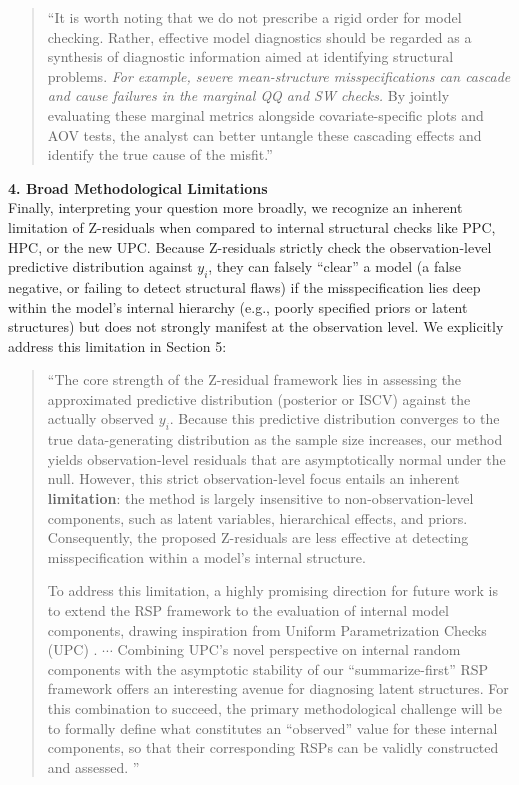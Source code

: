 \documentclass[11pt]{article}
\begin{document}
\begin{quote}
``It is worth noting that we do not prescribe a rigid order for model checking. Rather, effective model diagnostics should be regarded as a synthesis of diagnostic information aimed at identifying structural problems. \textit{For example, severe mean-structure misspecifications can cascade and cause failures in the \textit{marginal} QQ and SW checks.} By jointly evaluating these marginal metrics alongside covariate-specific plots and AOV tests, the analyst can better untangle these cascading effects and identify the true cause of the misfit.''
\end{quote}

\textbf{4. Broad Methodological Limitations} \\
Finally, interpreting your question more broadly, we recognize an inherent limitation of Z-residuals when compared to internal structural checks like PPC, HPC, or the new UPC. Because Z-residuals strictly check the observation-level predictive distribution against $y_i$, they can falsely ``clear'' a model (a false negative, or failing to detect structural flaws) if the misspecification lies deep within the model's internal hierarchy (e.g., poorly specified priors or latent structures) but does not strongly manifest at the observation level. We explicitly address this limitation in Section 5:

\begin{quote}
``The core strength of the Z-residual framework lies in assessing the approximated predictive distribution (posterior or ISCV) against the actually observed $y_i$. Because this predictive distribution converges to the true data-generating distribution as the sample size increases, our method yields observation-level residuals that are asymptotically normal under the null. However, this strict observation-level focus entails an inherent \textbf{limitation}: the method is largely insensitive to non-observation-level components, such as latent variables, hierarchical effects, and priors. Consequently, the proposed Z-residuals are less effective at detecting misspecification within a model's internal structure.


To address this limitation, a highly promising direction for future work is to extend the RSP framework to the evaluation of internal model components, drawing inspiration from Uniform Parametrization Checks (UPC) \citep{covington2025bayesian}. $\cdots$ Combining UPC's novel perspective on internal random components with the asymptotic stability of our ``summarize-first'' RSP framework offers an interesting avenue for diagnosing latent structures. For this combination to succeed, the primary methodological challenge will be to formally define what constitutes an ``observed'' value for these internal components, so that their corresponding RSPs can be validly constructed and assessed.
''
\end{quote}

\setlength{\bibsep}{0.2em}


\end{document}
